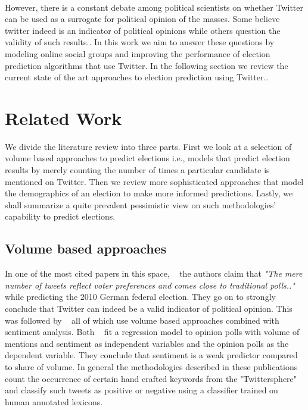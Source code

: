 \paragraph{}
However, there is a constant debate among political scientists on whether Twitter can be used as a surrogate for political opinion of the masses.
Some believe twitter indeed is an indicator of political opinions while others question the validity of such results.. 
In this work we aim to answer these questions by modeling online social groups and improving the performance of election prediction algorithms that use Twitter.
In the following section we review the current state of the art approaches to election prediction using Twitter.. 
\section{Related Work}
We divide the literature review into three parts.
First we look at a selection of volume based approaches to predict elections i.e., models that predict election results by merely counting the number of times a particular candidate is mentioned on Twitter.
Then we review more sophisticated approaches that model the demographics of an election to make more informed predictions.
Lastly, we shall summarize a quite prevalent pessimistic view on such methodologies' capability to predict elections.
\subsection{Volume based approaches}
In one of the most cited papers in this space, ~\cite{tumasjan2010predicting} the authors claim that 
\emph{ "The mere number of tweets reflect voter preferences and comes close to  traditional polls.."}
while predicting  the 2010 German federal election. %
They go on to strongly conclude that Twitter can indeed be a valid indicator of political opinion.
This was followed by ~\cite{o2010tweets,saez2011total,bermingham2011using,demartini2011analyzing} all of which use volume based approaches combined with sentiment analysis.
Both ~\cite{o2010tweets,bermingham2011using} fit a regression model to opinion polls with volume of mentions and sentiment as independent variables and the opinion polls as the dependent variable. 
They conclude that sentiment is a weak predictor compared to share of volume.
\newline 
In general the methodologies described in these publications count the occurrence of certain hand crafted keywords from the "Twittersphere" and classify such tweets as positive or negative using a classifier trained on human annotated lexicons.
